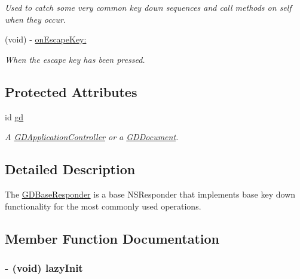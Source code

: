 \begin{DoxyCompactItemize}
\begin{DoxyCompactList}\small\item\em Used to catch some very common key down sequences and call methods on self when they occur. \item\end{DoxyCompactList}\item 
\hypertarget{interface_g_d_base_responder_a5d40b8266ef769de6ffd002daa34ca7a}{
(void) -\/ \hyperlink{interface_g_d_base_responder_a5d40b8266ef769de6ffd002daa34ca7a}{onEscapeKey:}}
\label{interface_g_d_base_responder_a5d40b8266ef769de6ffd002daa34ca7a}

\begin{DoxyCompactList}\small\item\em When the escape key has been pressed. \item\end{DoxyCompactList}\end{DoxyCompactItemize}
\subsection*{Protected Attributes}
\begin{DoxyCompactItemize}
\item 
\hypertarget{interface_g_d_base_responder_ac61a7cc1f627bfdba1648fca84532383}{
id \hyperlink{interface_g_d_base_responder_ac61a7cc1f627bfdba1648fca84532383}{gd}}
\label{interface_g_d_base_responder_ac61a7cc1f627bfdba1648fca84532383}

\begin{DoxyCompactList}\small\item\em A \hyperlink{interface_g_d_application_controller}{GDApplicationController} or a \hyperlink{interface_g_d_document}{GDDocument}. \item\end{DoxyCompactList}\end{DoxyCompactItemize}


\subsection{Detailed Description}
The \hyperlink{interface_g_d_base_responder}{GDBaseResponder} is a base NSResponder that implements base key down functionality for the most commonly used operations. 

\subsection{Member Function Documentation}
\hypertarget{interface_g_d_base_responder_a41c0ac5bc661491a77d3e92cbdb1ba27}{
\subsubsection[{lazyInit}]{\setlength{\rightskip}{0pt plus 5cm}-\/ (void) lazyInit }}
\label{interface_g_d_base_responder_a41c0ac5bc661491a77d3e92cbdb1ba27}


